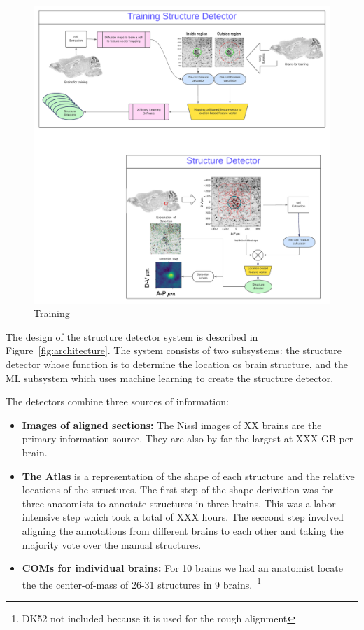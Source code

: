 \documentclass[11pt]{article}
\begin{document}
\begin{figure}[t]
  \includegraphics[width=\textwidth]{figures/Training.pdf}
  \caption{Training \label{fig:training}}
\end{figure}
The design of the structure detector system is described in Figure~\ref{fig:architecture}.
The system consists of two subsystems: the structure detector whose
function is to determine the location os brain structure, and the ML
subsystem which uses machine learning to create the structure detector.

The detectors combine three sources of information:
\begin{itemize}
    \item {\bf Images of aligned sections:} The Nissl images of XX brains are the primary information source. They are also by far the largest at XXX GB per brain.
    \item {\bf The Atlas} is a representation of the shape of each
      structure and the relative locations of the structures. The
      first step of the shape derivation was for three anatomists to
      annotate structures in three brains. This was a labor intensive
      step which took a total of XXX hours. The seccond step involved
      aligning the annotations from different brains to each other and
      taking the majority vote over the manual structures.
    \item {\bf COMs for individual brains:} For 10 brains we had an
      anatomist locate the the center-of-mass of 26-31 structures in 9
      brains.~\footnote{DK52 not included because it is used for the
        rough alignment}
\end{itemize}
\end{document}
